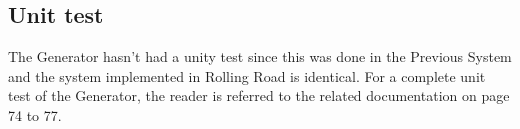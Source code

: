 \subsection{Unit test}
The Generator hasn't had a unity test since this was done in the Previous System\cite{BAC_rullefelt} and the system implemented in Rolling Road is identical. For a complete unit test of the Generator, the reader is referred to the related documentation on page 74 to 77.